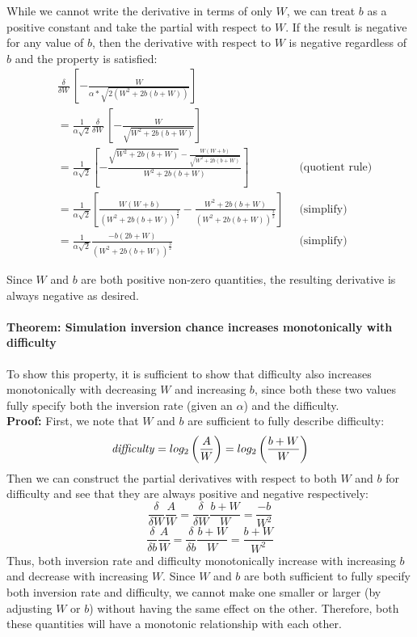 \documentclass[aps,pre,groupedaddress]{revtex4-2}
\begin{document}
While we cannot write the derivative in terms of only $W$, we can treat $b$ as a positive constant and take the partial with respect to $W$. If the result is negative for any value of $b$, then the derivative with respect to $W$ is negative regardless of $b$ and the property is satisfied:
\begin{align}
& \frac{\delta}{\delta W}\, \left[-\frac{W}{\alpha*\sqrt{2(W^2 + 2b(b+W))}}\right]& \nonumber\\
& = \frac{1}{\alpha\sqrt{2}} \frac{\delta}{\delta W}\, \left[-\frac{W}{\sqrt{W^2 + 2b(b+W)}}\right]& \nonumber\\
& = \frac{1}{\alpha\sqrt{2}} \left[-\frac{\sqrt{W^2 + 2b(b+W)} - \frac{W(W+b)}{\sqrt{W^2 + 2b(b+W)}} }{W^2 + 2b(b+W)}\right]\;\; & \text{(quotient rule)} \nonumber\\
& = \frac{1}{\alpha\sqrt{2}} \left[ \frac{W(W+b)}{(W^2 + 2b(b+W))^\frac{3}{2}} - \frac{W^2+2b(b+W)}{(W^2 + 2b(b+W))^\frac{3}{2}}\right]\;\; & \text{(simplify)}\nonumber\\
& = \frac{1}{\alpha\sqrt{2}} \frac{-b(2b+W)}{(W^2 + 2b(b+W))^\frac{3}{2}}\;\; & \text{(simplify)}
\label{eq:inv_derivative_W}
\end{align}

Since $W$ and $b$ are both positive non-zero quantities, the resulting derivative is always negative as desired.  

\paragraph{\textbf{Theorem:} Simulation inversion chance increases monotonically with difficulty}
To show this property, it is sufficient to show that difficulty also increases monotonically with decreasing $W$ and increasing $b$, since both these two values fully specify both the inversion rate (given an $\alpha$) and the difficulty.\\
\textbf{Proof:} First, we note that $W$ and $b$ are sufficient to fully describe difficulty:
\begin{equation}
\text{\textit{difficulty}} = log_2\left(\frac{A}{W}\right) = log_2\left(\frac{ b+W}{W}\right)  
\end{equation}
Then we can construct the partial derivatives with respect to both $W$ and $b$ for difficulty and see that they are always positive and negative respectively:
\begin{equation}
\frac{\delta}{\delta W} \frac{A}{W} =\frac{\delta}{\delta W} \frac{b+W}{W} = \frac{-b}{W^2}
\end{equation}
\begin{equation}
\frac{\delta}{\delta b} \frac{A}{W} =\frac{\delta}{\delta b} \frac{b+W}{W} = \frac{b+W}{W^2}
\end{equation}
Thus, both inversion rate and difficulty monotonically increase with increasing $b$ and decrease with increasing $W$. Since $W$ and $b$ are both sufficient to fully specify both inversion rate and difficulty, we cannot make one smaller or larger (by adjusting $W$ or $b$) without having the same effect on the other. Therefore, both these quantities will have a monotonic relationship with each other.
\end{document}
